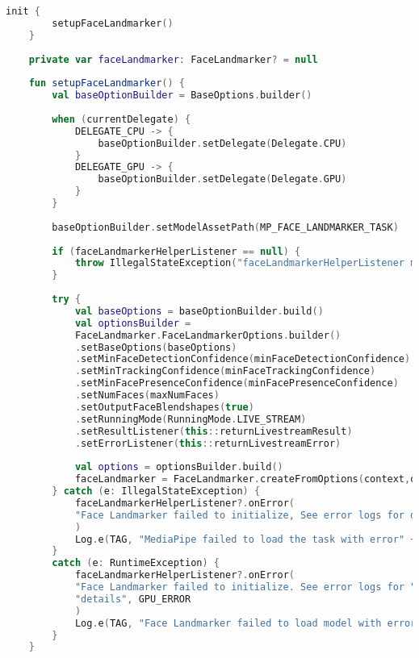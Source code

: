 \begin{lstlisting}[language=Kotlin, caption=init() en setupFaceLandmarker() in FaceLandmarkerHelper.kt]
    init {
        setupFaceLandmarker()
    }
    
    private var faceLandmarker: FaceLandmarker? = null
    
    fun setupFaceLandmarker() {
        val baseOptionBuilder = BaseOptions.builder()
        
        when (currentDelegate) {
            DELEGATE_CPU -> {
                baseOptionBuilder.setDelegate(Delegate.CPU)
            }
            DELEGATE_GPU -> {
                baseOptionBuilder.setDelegate(Delegate.GPU)
            }
        }
        
        baseOptionBuilder.setModelAssetPath(MP_FACE_LANDMARKER_TASK)
        
        if (faceLandmarkerHelperListener == null) {
            throw IllegalStateException("faceLandmarkerHelperListener must be set when runningMode is LIVE_STREAM")
        }
        
        try {
            val baseOptions = baseOptionBuilder.build()
            val optionsBuilder =
            FaceLandmarker.FaceLandmarkerOptions.builder()
            .setBaseOptions(baseOptions)
            .setMinFaceDetectionConfidence(minFaceDetectionConfidence)
            .setMinTrackingConfidence(minFaceTrackingConfidence)
            .setMinFacePresenceConfidence(minFacePresenceConfidence)
            .setNumFaces(maxNumFaces)
            .setOutputFaceBlendshapes(true)
            .setRunningMode(RunningMode.LIVE_STREAM)
            .setResultListener(this::returnLivestreamResult)
            .setErrorListener(this::returnLivestreamError)
            
            val options = optionsBuilder.build()
            faceLandmarker = FaceLandmarker.createFromOptions(context,options)
        } catch (e: IllegalStateException) {
            faceLandmarkerHelperListener?.onError(
            "Face Landmarker failed to initialize, See error logs for details"
            )
            Log.e(TAG, "MediaPipe failed to load the task with error" + e.message)
        }
        catch (e: RuntimeException) {
            faceLandmarkerHelperListener?.onError(
            "Face Landmarker failed to initialize. See error logs for " +
            "details", GPU_ERROR
            )
            Log.e(TAG, "Face Landmarker failed to load model with error: " + e.message)
        }
    }
\end{lstlisting}

